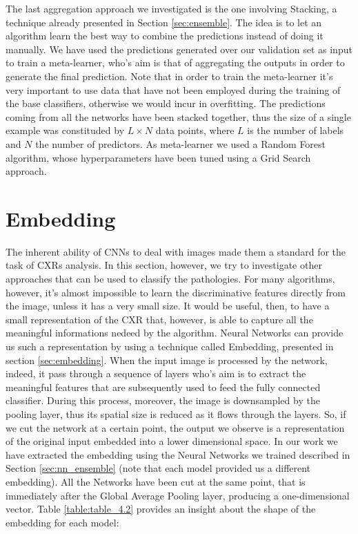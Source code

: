 \noindent{}

\vspace{2mm}

\noindent The last aggregation approach we investigated is the one involving Stacking, a technique already presented in Section \ref{sec:ensemble}. The idea is to let an algorithm learn the best way to combine the predictions instead of doing it manually. 
We have used the predictions generated over our validation set as input to train a meta-learner, who's aim is that of aggregating the outputs in order to generate the final prediction. Note that in order to train the meta-learner it's very important to use data that have not been employed during the training of the base classifiers, otherwise we would incur in overfitting.
The predictions coming from all the networks have been stacked together, thus the size of a single example was constituded by $L \times N$ data points, where $L$ is the number of labels and $N$ the number of predictors.
As meta-learner we used a Random Forest algorithm, whose hyperparameters have been tuned using a Grid Search approach.

\section{Embedding}
\label{sec:nn_embedding}
The inherent ability of \acp{CNN} to deal with images made them a standard for the task of \acp{CXR} analysis. In this section, however, we try to investigate other approaches that can be used to classify the pathologies. For many algorithms, however, it's almost impossible to learn the discriminative features directly from the image, unless it has a very small size. It would be useful, then, to have a small representation of the \ac{CXR} that, however, is able to capture all the meaningful informations nedeed by the algorithm. Neural Networks can provide us such a representation by using a technique called Embedding, presented in section \ref{sec:embedding}. When the input image is processed by the network, indeed, it pass through a sequence of layers who's aim is to extract the meaningful features that are subsequently used to feed the fully connected classifier. During this process, moreover, the image is downsampled by the pooling layer, thus its spatial size is reduced as it flows through the layers. So, if we cut the network at a certain point, the output we observe is a representation of the original input embedded into a lower dimensional space. 
In our work we have extracted the embedding using the Neural Networks we trained described in Section \ref{sec:nn_ensemble} (note that each model provided us a different embedding). All the Networks have been cut at the same point, that is immediately after the Global Average Pooling layer, producing a one-dimensional vector. Table \ref{table:table_4.2} provides an insight about the shape of the embedding for each model:


